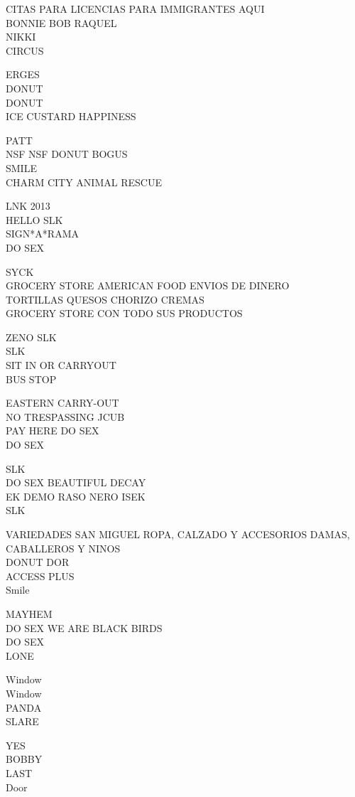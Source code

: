 \documentclass[10pt,letterpaper]{article}
\begin{document}
CITAS PARA LICENCIAS PARA IMMIGRANTES AQUI\\
BONNIE BOB RAQUEL\\
NIKKI\\
CIRCUS

ERGES\\
DONUT\\
DONUT\\
ICE CUSTARD HAPPINESS

PATT\\
NSF NSF DONUT BOGUS\\
SMILE\\
CHARM CITY ANIMAL RESCUE

LNK 2013\\
HELLO SLK\\
SIGN*A*RAMA\\
DO SEX

SYCK\\
GROCERY STORE AMERICAN FOOD ENVIOS DE DINERO\\
TORTILLAS QUESOS CHORIZO CREMAS\\
GROCERY STORE CON TODO SUS PRODUCTOS

ZENO SLK\\
SLK\\
SIT IN OR CARRYOUT\\
BUS STOP

EASTERN CARRY{-}OUT\\
NO TRESPASSING JCUB\\
PAY HERE DO SEX\\
DO SEX

SLK\\
DO SEX BEAUTIFUL DECAY\\
EK DEMO RASO NERO ISEK\\
SLK

VARIEDADES SAN MIGUEL ROPA, CALZADO Y ACCESORIOS DAMAS, CABALLEROS Y NINOS\\
DONUT DOR\\
ACCESS PLUS\\
Smile

MAYHEM\\
DO SEX WE ARE BLACK BIRDS\\
DO SEX\\
LONE

Window\\
Window\\
PANDA\\
SLARE

YES\\
BOBBY\\
LAST\\
Door
\end{document}
